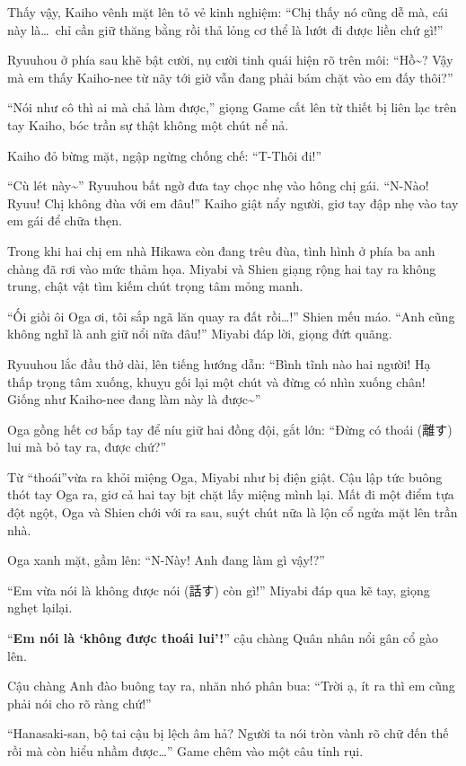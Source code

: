 \documentclass[../main.tex]{subfiles}
\begin{document}
Thấy vậy, Kaiho vênh mặt lên tỏ vẻ kinh nghiệm: ``Chị thấy nó cũng dễ mà, cái này là\dots\ chỉ cần giữ thăng bằng rồi thả lỏng cơ thể là lướt đi được liền chứ gì!''

Ryuuhou ở phía sau khẽ bật cười, nụ cười tinh quái hiện rõ trên môi: ``Hồ\~{}? Vậy mà em thấy Kaiho-nee từ nãy tới giờ vẫn đang phải bám chặt vào em đấy thôi?''

``Nói như cô thì ai mà chả làm được,'' giọng Game cất lên từ thiết bị liên lạc trên tay Kaiho, bóc trần sự thật không một chút nể nả.

Kaiho đỏ bừng mặt, ngập ngừng chống chế: ``T-Thôi đi!''

``Cù lét này\~{}'' Ryuuhou bất ngờ đưa tay chọc nhẹ vào hông chị gái. ``N-Nào! Ryuu! Chị không đùa với em đâu!'' Kaiho giật nẩy người, giơ tay đập nhẹ vào tay em gái để chữa thẹn.

Trong khi hai chị em nhà Hikawa còn đang trêu đùa, tình hình ở phía ba anh chàng đã rơi vào mức thảm họa. Miyabi và Shien giạng rộng hai tay ra không trung, chật vật tìm kiếm chút trọng tâm mỏng manh.

``Ối giồi ôi Oga ơi, tôi sắp ngã lăn quay ra đất rồi\dots!'' Shien mếu máo. ``Anh cũng không nghĩ là anh giữ nổi nữa đâu!'' Miyabi đáp lời, giọng đứt quãng.

Ryuuhou lắc đầu thở dài, lên tiếng hướng dẫn: ``Bình tĩnh nào hai người! Hạ thấp trọng tâm xuống, khuỵu gối lại một chút và đừng có nhìn xuống chân! Giống như Kaiho-nee đang làm này là được\~{}''

Oga gồng hết cơ bắp tay để níu giữ hai đồng đội, gắt lớn: ``Đừng có thoái (離す) lui mà bỏ tay ra, được chứ?''

Từ ``thoái''vừa ra khỏi miệng Oga, Miyabi như bị điện giật. Cậu lập tức buông thót tay Oga ra, giơ cả hai tay bịt chặt lấy miệng mình lại. Mất đi một điểm tựa đột ngột, Oga và Shien chới với ra sau, suýt chút nữa là lộn cổ ngửa mặt lên trần nhà.


Oga xanh mặt, gầm lên: ``N-Này! Anh đang làm gì vậy!?''

``Em vừa nói là không được nói (話す) còn gì!'' Miyabi đáp qua kẽ tay, giọng nghẹt lạilại.

``\textbf{Em nói là `không được thoái lui'!}'' cậu chàng Quân nhân nổi gân cổ gào lên.

Cậu chàng Anh đào buông tay ra, nhăn nhó phân bua: ``Trời ạ, ít ra thì em cũng phải nói cho rõ ràng chứ!''

``Hanasaki-san, bộ tai cậu bị lệch âm hả? Người ta nói tròn vành rõ chữ đến thế rồi mà còn hiểu nhầm được\dots'' Game chêm vào một câu tỉnh rụi.
\end{document}
